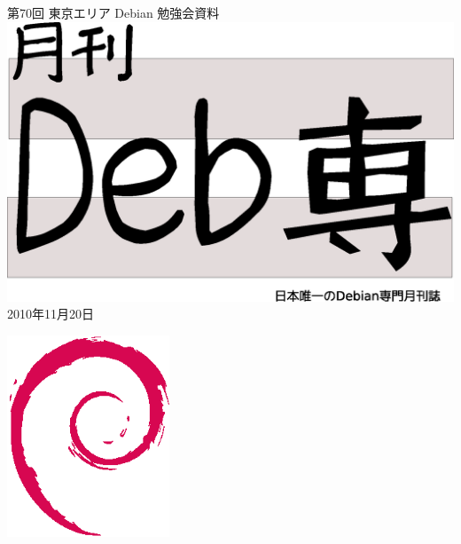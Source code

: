 \documentclass[mingoth,a4paper]{jsarticle}
\newcommand{\debmtgyear}{2010}
\newcommand{\debmtgmonth}{11}
\newcommand{\debmtgdate}{20}
\newcommand{\debmtgnumber}{70}
\begin{document}
\begin{titlepage}
\thispagestyle{empty}

\vspace*{-2cm}
第\debmtgnumber{}回 東京エリア Debian 勉強会資料\\
\hspace*{-2cm}
\includegraphics[width=210mm]{image201003/debsen.eps}\\
\hfill{}\debmtgyear{}年\debmtgmonth{}月\debmtgdate{}日


\vspace*{-2cm}
\hfill{}\includegraphics[height=6cm]{image200502/openlogo-nd.eps}
\end{titlepage}

\end{document}

